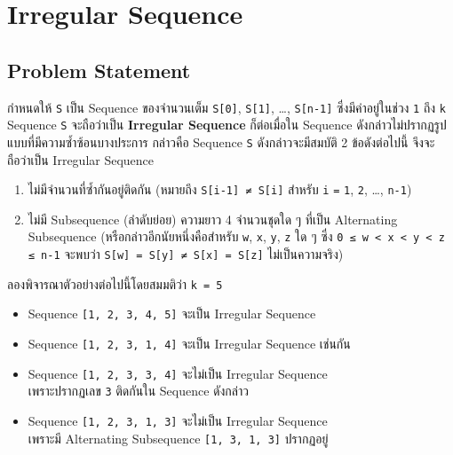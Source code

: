 \section{Irregular Sequence}

\subsection{Problem Statement}

กำหนดให้ \lstinline{S} เป็น Sequence ของจำนวนเต็ม \lstinline{S[0]}, \lstinline{S[1]}, \ldots, \lstinline{S[n-1]} ซึ่งมีค่าอยู่ในช่วง \lstinline{1} ถึง \lstinline{k} \;
Sequence \lstinline{S} จะถือว่าเป็น \textbf{Irregular Sequence} ก็ต่อเมื่อใน Sequence ดังกล่าวไม่ปรากฏรูปแบบที่มีความซ้ำซ้อนบางประการ กล่าวคือ Sequence \lstinline{S} ดังกล่าวจะมีสมบัติ 2 ข้อดังต่อไปนี้ จึงจะถือว่าเป็น Irregular Sequence\;

\begin{enumerate}
    \item 
        ไม่มีจำนวนที่ซ้ำกันอยู่ติดกัน (หมายถึง \lstinline{S[i-1] ≠ S[i]} สำหรับ \lstinline{i} \lstinline{=} \lstinline{1}, \lstinline{2}, \ldots, \lstinline{n-1})
    \item
        ไม่มี Subsequence (ลำดับย่อย) ความยาว 4 จำนวนชุดใด ๆ ที่เป็น Alternating Subsequence (หรือกล่าวอีกนัยหนึ่งคือสำหรับ \lstinline{w}, \lstinline{x}, \lstinline{y}, \lstinline{z} ใด ๆ ซึ่ง \lstinline{0 ≤ w < x < y < z ≤ n-1} จะพบว่า \lstinline{S[w] = S[y] ≠ S[x] = S[z]} ไม่เป็นความจริง) 
\end{enumerate}

\bigskip
ลองพิจารณาตัวอย่างต่อไปนี้โดยสมมติว่า \lstinline{k = 5}

\begin{itemize}[leftmargin=4pc]
    \item  Sequence \lstinline{[1, 2, 3, 4, 5]} จะเป็น Irregular Sequence
    \item  Sequence \lstinline{[1, 2, 3, 1, 4]} จะเป็น Irregular Sequence เช่นกัน
    \item  Sequence \lstinline{[1, 2, 3, 3, 4]} จะไม่เป็น Irregular Sequence \\
        เพราะปรากฏเลข \lstinline{3} ติดกันใน Sequence ดังกล่าว
    \item  Sequence \lstinline{[1, 2, 3, 1, 3]} จะไม่เป็น Irregular Sequence \\ 
        เพราะมี Alternating Subsequence \lstinline{[1, 3, 1, 3]} ปรากฏอยู่
\end{itemize}


